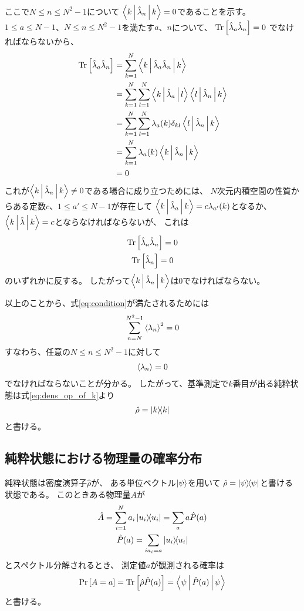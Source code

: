 \documentclass[a4paper, 10pt]{jsarticle}
\begin{document}
ここで$N \leq n \leq N^2 - 1$について
$\Braket{k | \hat{\lambda}_n | k} = 0$であることを示す。
$1 \leq a \leq N-1$、$N \leq n \leq N^2-1$を満たす$a$、$n$について、
$\operatorname*{Tr} \left[ \hat{\lambda}_a \hat{\lambda}_n \right] = 0$
でなければならないから、
\begin{align}
	\operatorname*{Tr} \left[ \hat{\lambda}_a \hat{\lambda}_n \right]
	&= \sum_{k=1}^{N} \Braket{k | \hat{\lambda}_a \hat{\lambda}_n | k} \\
	&= \sum_{k=1}^{N} \sum_{l=1}^{N} \Braket{k | \hat{\lambda}_a | l}
	\Braket{l | \hat{\lambda}_n | k} \\
	&=  \sum_{k=1}^{N} \sum_{l=1}^{N} \lambda_a (k) \delta_{kl}
	\Braket{l | \hat{\lambda}_n | k} \\
	&= \sum_{k=1}^{N} \lambda_a (k) \Braket{k | \hat{\lambda}_n | k} \\
	&= 0
\end{align}
これが$\Braket{k | \hat{\lambda}_n | k} \neq 0$である場合に成り立つためには、
$N$次元内積空間の性質からある定数$c$、$1 \leq a' \leq N-1$が存在して
$\Braket{k | \hat{\lambda}_a | k} = c \lambda_{a'}(k)$となるか、
$\Braket{k | \hat{\lambda} | k} = c$とならなければならないが、
これは
\begin{gather}
	\operatorname*{Tr} \left[ \hat{\lambda}_a \hat{\lambda}_n \right] = 0 \\
	\operatorname*{Tr} \left[ \hat{\lambda}_n \right] = 0
\end{gather}
のいずれかに反する。
したがって$\Braket{k | \hat{\lambda}_n | k}$は0でなければならない。

以上のことから、式\eqref{eq:condition}が満たされるためには
\begin{align}
	\sum_{n=N}^{N^2 - 1} \Braket{\lambda_n}^2 = 0
\end{align}
すなわち、任意の$N \leq n \leq N^2 - 1$に対して
\begin{align}
	\Braket{\lambda_n} = 0
\end{align}
でなければならないことが分かる。
したがって、基準測定で$k$番目が出る純粋状態は式\eqref{eq:dens_op_of_k}より
\begin{align}
	\hat{\rho} = \Ket{k} \! \! \Bra{k}
\end{align}
と書ける。

\subsection{純粋状態における物理量の確率分布} \label{ss:prob}
純粋状態は密度演算子$\hat{\rho}$が、
ある単位ベクトル$\Ket{\psi}$を用いて
$\hat{\rho} = \Ket{\psi} \! \! \Bra{\psi}$と書ける状態である。
このときある物理量$A$が
\begin{gather}
	\hat{A} = \sum_{i=1}^{N} a_i \Ket{u_i} \! \! \Bra{u_i}
	= \sum_a a \hat{P}(a) \\
	\hat{P}(a) = \sum_{i a_i = a} \Ket{u_i} \! \! \Bra{u_i}
\end{gather}
とスペクトル分解されるとき、
測定値$a$が観測される確率は
\begin{align}
	\Pr \left[ A = a \right] = \operatorname*{Tr} \left[ \hat{\rho} \hat{P}(a) \right]
	= \Braket{\psi | \hat{P}(a) | \psi}
\end{align}
と書ける。
\end{document}
